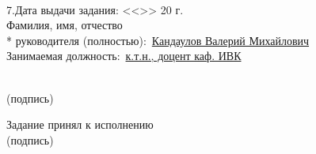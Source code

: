 \noindent \underline{\hspace{\textwidth}}
\noindent \underline{\hspace{\textwidth}}
\noindent \underline{\hspace{\textwidth}}
\noindent \underline{\hspace{\textwidth}}\\

\noindent 7.Дата выдачи задания: <<\underline{\hspace{1cm}}>>\underline{\hspace{3.5cm}} 20\underline{\hspace{0.8cm}} г.\\

\noindent Фамилия, имя, отчество\\*
руководителя (полностью):~\uline{Кандаулов Валерий Михайлович\hfill}\\
\noindent Занимаемая должность:~\uline{к.т.н., доцент каф. ИВК\hfill}
\begin{flushright}
  \underline{\hspace{5cm}}\\
  \small
  (подпись)\hspace*{1.5cm}
  \normalsize
\end{flushright}


\noindent Задание принял к исполнению~\uline{\hfill}\\
\hspace*{11.5cm}
\small
(подпись)
\normalsize

\restoregeometry

